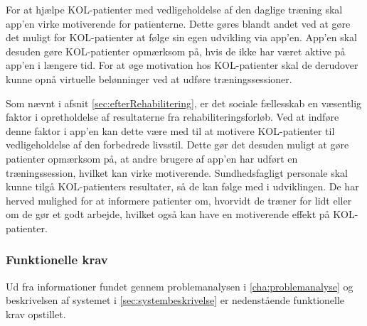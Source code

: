 For at hjælpe KOL-patienter med vedligeholdelse af den daglige træning skal app’en virke motiverende for patienterne. Dette gøres blandt andet ved at gøre det muligt for KOL-patienter at følge sin egen udvikling via app’en. App’en skal desuden gøre KOL-patienter opmærksom på, hvis de ikke har været aktive på app'en i længere tid. For at øge motivation hos KOL-patienter skal de derudover kunne opnå virtuelle belønninger ved at udføre træningssessioner.

Som nævnt i afsnit \ref{sec:efterRehabilitering}, er det sociale fællesskab en væsentlig faktor i opretholdelse af resultaterne fra rehabiliteringsforløb. Ved at indføre denne faktor i app’en kan dette være med til at motivere KOL-patienter til vedligeholdelse af den forbedrede livsstil. Dette gør det desuden muligt at gøre patienter opmærksom på, at andre brugere af app’en har udført en træningssession, hvilket kan virke motiverende.
Sundhedsfagligt personale skal kunne tilgå KOL-patienters resultater, så de kan følge med i udviklingen. De har herved mulighed for at informere patienter om, hvorvidt de træner for lidt eller om de gør et godt arbejde, hvilket også kan have en motiverende effekt på KOL-patienter.

\subsubsection{Funktionelle krav}
Ud fra informationer fundet gennem problemanalysen i \autoref{cha:problemanalyse} og beskrivelsen af systemet i \autoref{sec:systembeskrivelse} er nedenstående funktionelle krav opstillet. 
  
